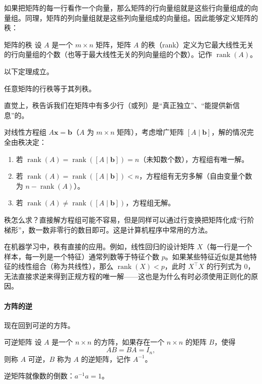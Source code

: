 如果把矩阵的每一行看作一个向量，那么矩阵的行向量组就是这些行向量组成的向量组。同理，矩阵的列向量组就是这些列向量组成的向量组。因此能够定义矩阵的秩：
\begin{definition}{矩阵的秩}{}
    设 \(A\) 是一个 \(m \times n\) 矩阵，矩阵 \(A\) 的秩（rank）定义为它最大线性无关的行向量组的个数（也等于最大线性无关的列向量组的个数）。记作 \(\operatorname{rank}(A)\)。
\end{definition}

以下定理成立。
\begin{theorem}{}{}
    任意矩阵的行秩等于其列秩。
\end{theorem}

直觉上，秩告诉我们在矩阵中有多少行（或列）是“真正独立”、“能提供新信息”的。

对线性方程组 \(A\mathbf{x} = \mathbf{b}\)（\(A\) 为 \(m\times n\) 矩阵），考虑增广矩阵 \([A \mid \mathbf{b}]\)，解的情况完全由秩决定：
\begin{enumerate}
    \item 若 \(\operatorname{rank}(A) = \operatorname{rank}([A \mid \mathbf{b}]) = n\)（未知数个数），方程组有唯一解。
    \item 若 \(\operatorname{rank}(A) = \operatorname{rank}([A \mid \mathbf{b}]) < n\)，方程组有无穷多解（自由变量个数为 \(n - \operatorname{rank}(A)\)）。
    \item 若 \(\operatorname{rank}(A) \neq \operatorname{rank}([A \mid \mathbf{b}])\)，方程组无解。
\end{enumerate}

秩怎么求？直接解方程组可能不容易，但是同样可以通过行变换把矩阵化成“行阶梯形”，数一数非零行的数目即可。这是计算机程序中常用的方法。

在机器学习中，秩有直接的应用。例如，线性回归的设计矩阵 \(X\)（每一行是一个样本，每一列是一个特征）通常列数等于特征个数 \(p\)。如果某些特征近似是其他特征的线性组合（称为共线性），那么 \(\operatorname{rank}(X) < p\)，此时 \(X^\top X\) 的行列式为 \(0\)，无法直接求逆来得到正规方程的唯一解——这也是为什么有时必须使用正则化的原因。

\paragraph{方阵的逆}

现在回到可逆的方阵。
\begin{definition}{可逆矩阵}{}
    设 \(A\) 是一个 \(n \times n\) 的方阵，如果存在一个 \(n \times n\) 的矩阵 \(B\)，使得
    \[
        AB = BA = I_n,
    \]
    则称 \(A\) 可逆，\(B\) 称为 \(A\) 的逆矩阵，记作 \(A^{-1}\)。
\end{definition}
逆矩阵就像数的倒数：\(a^{-1}a = 1\)。

